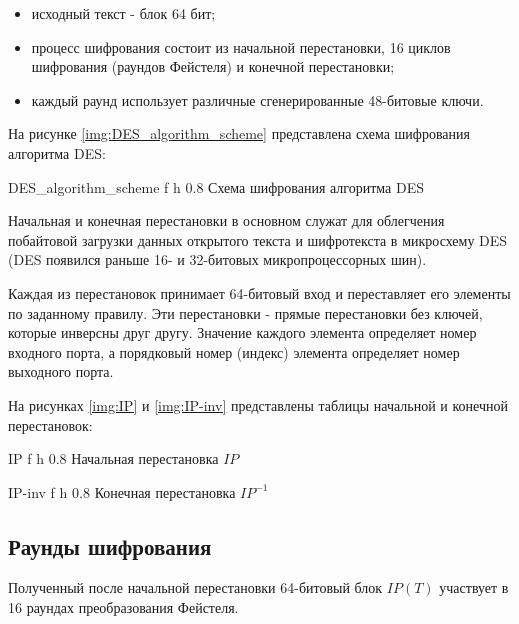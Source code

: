 \begin{itemize}
	\item исходный текст - блок 64 бит;
	\item процесс шифрования состоит из начальной перестановки, 16 циклов шифрования (раундов Фейстеля) и конечной перестановки;
	\item каждый раунд использует различные сгенерированные 48-битовые ключи.
\end{itemize}

На рисунке \ref{img:DES_algorithm_scheme} представлена схема шифрования алгоритма DES:

{DES_algorithm_scheme} %
{f} %
{h} %
{0.8\textwidth} %
{Схема шифрования алгоритма DES} %

Начальная и конечная перестановки в основном служат для облегчения побайтовой загрузки данных открытого текста и шифротекста в микросхему DES (DES появился раньше 16- и 32-битовых микропроцессорных шин).

Каждая из перестановок принимает 64-битовый вход и переставляет его элементы по заданному правилу. Эти перестановки - прямые перестановки без ключей, которые инверсны друг другу. Значение каждого элемента определяет номер входного порта, а порядковый номер (индекс) элемента определяет номер выходного порта.

На рисунках \ref{img:IP} и \ref{img:IP-inv}  представлены таблицы начальной и конечной перестановок:

{IP} %
{f} %
{h} %
{0.8\textwidth} %
{Начальная перестановка $IP$} %

{IP-inv} %
{f} %
{h} %
{0.8\textwidth} %
{Конечная перестановка $IP^{-1}$} %

\subsection{Раунды шифрования}

Полученный после начальной перестановки 64-битовый блок $IP(T)$ участвует в 16 раундах преобразования Фейстеля.

